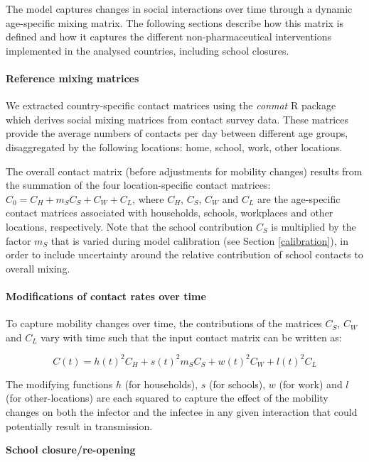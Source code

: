 The model captures changes in social interactions over time through a dynamic age-specific mixing matrix. The following
sections describe how this matrix is defined and how it captures the different non-pharmaceutical interventions implemented
in the analysed countries, including school closures.

\paragraph{Reference mixing matrices}
We extracted country-specific contact matrices using the \textit{conmat} R package which derives social mixing matrices from 
contact survey data. These matrices provide the average numbers of contacts per day between different age groups, disaggregated by the following 
locations: home, school, work, other locations. 

The overall contact matrix (before adjustments for mobility changes) results from the summation of the four location-specific 
contact matrices: \(C_{0} = C_{H} + m_S C_{S} + C_{W} + C_{L}\), where \(C_{H}\), \(C_{S}\), \(C_{W}\) and \(C_{L}\) are the age-specific
contact matrices associated with households, schools, workplaces and other locations, respectively. Note that the school contribution $C_{S}$ is 
multiplied by the factor $m_S$ that is varied during model calibration (see Section \ref{calibration}), in order to include uncertainty around 
the relative contribution of school contacts to overall mixing.

\paragraph{Modifications of contact rates over time}
\label{time_var_mixing}
To capture mobility changes over time, the contributions of the matrices \(C_{S}\), \(C_{W}\) and \(C_{L}\) vary with time such that the input contact matrix can be written as:

\begin{equation}
\label{eq_mixing}
  C(t)= h(t)^{2}C_{H}+ s(t)^{2} m_S C_{S}+ w(t)^{2}C_{W}+l(t)^{2}C_{L}
\end{equation}

The modifying functions $h$ (for households), $s$ (for schools), $w$ (for work) and $l$ (for other-locations) are each squared to capture the effect of the mobility changes on 
both the infector and the infectee in any given interaction that could potentially result in transmission. 

\vspace{5pt}
\textbf{School closure/re-opening}


